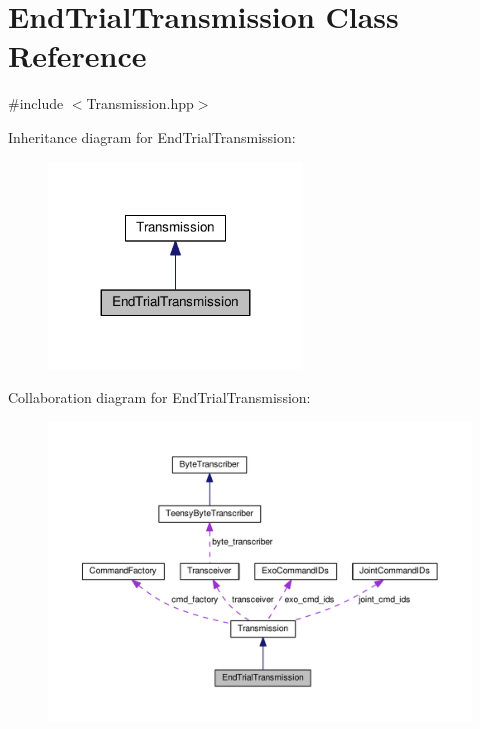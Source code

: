 \hypertarget{classEndTrialTransmission}{}\section{End\+Trial\+Transmission Class Reference}
\label{classEndTrialTransmission}


{\ttfamily \#include $<$Transmission.\+hpp$>$}



Inheritance diagram for End\+Trial\+Transmission\+:\nopagebreak
\begin{figure}[H]
\begin{center}
\leavevmode
\includegraphics[width=191pt]{classEndTrialTransmission__inherit__graph}
\end{center}
\end{figure}


Collaboration diagram for End\+Trial\+Transmission\+:\nopagebreak
\begin{figure}[H]
\begin{center}
\leavevmode
\includegraphics[width=350pt]{classEndTrialTransmission__coll__graph}
\end{center}
\end{figure}
